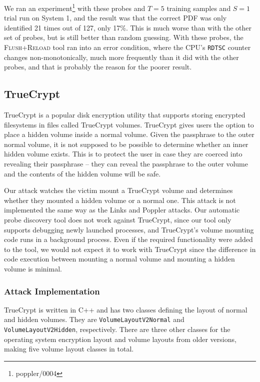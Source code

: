 \documentclass[letterpaper,twocolumn,10pt]{article}
\begin{document}
We ran an experiment\footnote{poppler/0004} with these probes and $T=5$ training
samples and $S=1$ trial run on System 1, and the result was that the correct PDF
was only identified 21 times out of 127, only 17\%. This is much worse than with
the other set of probes, but is still better than random guessing. With these
probes, the \textsc{Flush+Reload} tool ran into an error condition, where the
CPU's \texttt{RDTSC} counter changes non-monotonically, much more frequently
than it did with the other probes, and that is probably the reason for the
poorer result.

\subsection{TrueCrypt}

TrueCrypt is a popular disk encryption utility that supports storing encrypted
filesystems in files called TrueCrypt volumes. TrueCrypt gives users the option
to place a hidden volume inside a normal volume. Given the passphrase to the
outer normal volume, it is not supposed to be possible to determine whether an
inner hidden volume exists. This is to protect the user in case they are coerced
into revealing their passphrase -- they can reveal the passphrase to the outer
volume and the contents of the hidden volume will be safe. 

Our attack watches the victim mount a TrueCrypt volume and determines whether
they mounted a hidden volume or a normal one. This attack is not implemented the
same way as the Links and Poppler attacks. Our automatic probe discovery tool
does not work against TrueCrypt, since our tool only supports debugging newly
launched processes, and TrueCrypt's volume mounting code runs in a background
process. Even if the required functionality were added to the tool, we would not
expect it to work with TrueCrypt since the difference in code execution between
mounting a normal volume and mounting a hidden volume is minimal.

\subsubsection{Attack Implementation}

TrueCrypt is written in C++ and has two classes defining the layout of normal
and hidden volumes. They are \texttt{VolumeLayout\-V2Normal} and
\texttt{VolumeLayout\-V2Hidden}, respectively. There are three other classes for
the operating system encryption layout and volume layouts from older versions,
making five volume layout classes in total.
\end{document}
